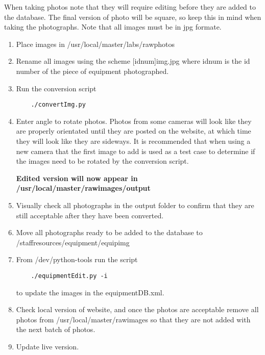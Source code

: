 \documentclass[justified]{LabArx1_5}
\begin{document}
When taking photos note that they will require editing before they are added to the database. The final version of photo will be square, so keep this in mind when taking the photographs. Note that all images must be in jpg formate.

\begin{enumerate}
\item Place images in /usr/local/master/labs/rawphotos
\item Rename all images using the scheme [idnum]img.jpg where idnum is the id number of the piece of equipment photographed.
\item Run the conversion script

	\begin{lstlisting}
	./convertImg.py       
	\end{lstlisting}

\item Enter angle to rotate photos. Photos from some cameras will look like they are properly orientated until they are posted on the website, at which time they will look like they are sideways. It is recommended that when using a new camera that the first image to add is used as a test case to determine if the images need to be rotated by the conversion script.

{\bf Edited version will now appear in /usr/local/master/rawimages/output}

\item Visually check all photographs in the output folder to confirm that they are still acceptable after they have been converted.

\item Move all photographs ready to be added to the database to /staffresources/equipment/equipimg
\item From /dev/python-tools run the script

	\begin{lstlisting}
	./equipmentEdit.py -i
	\end{lstlisting}

to update the images in the equipmentDB.xml.

\item Check local version of website, and once the photos are acceptable remove all photos from /usr/local/master/rawimages so that they are not added with the next batch of photos.

\item Update live version.
\end{enumerate}
\end{document}
